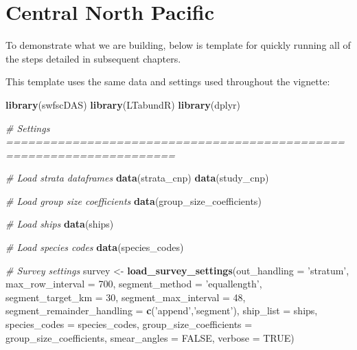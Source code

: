\documentclass[
]{book}
\newenvironment{Shaded}{\begin{snugshade}}{\end{snugshade}}
\newcommand{\CommentTok}[1]{\textcolor[rgb]{0.56,0.35,0.01}{\textit{#1}}}
\newcommand{\DataTypeTok}[1]{\textcolor[rgb]{0.13,0.29,0.53}{#1}}
\newcommand{\DecValTok}[1]{\textcolor[rgb]{0.00,0.00,0.81}{#1}}
\newcommand{\KeywordTok}[1]{\textcolor[rgb]{0.13,0.29,0.53}{\textbf{#1}}}
\newcommand{\NormalTok}[1]{#1}
\newcommand{\OtherTok}[1]{\textcolor[rgb]{0.56,0.35,0.01}{#1}}
\newcommand{\StringTok}[1]{\textcolor[rgb]{0.31,0.60,0.02}{#1}}
\begin{document}
\hypertarget{casestudies}{%
\chapter{Central North Pacific}\label{casestudies}}

To demonstrate what we are building, below is template for quickly running all of the steps detailed in subsequent chapters.

This template uses the same data and settings used throughout the vignette:

\begin{Shaded}
\begin{Highlighting}[]
\KeywordTok{library}\NormalTok{(swfscDAS)}
\KeywordTok{library}\NormalTok{(LTabundR)}
\KeywordTok{library}\NormalTok{(dplyr)}

\CommentTok{# Settings =====================================================================}

\CommentTok{# Load strata dataframes}
\KeywordTok{data}\NormalTok{(strata_cnp)}
\KeywordTok{data}\NormalTok{(study_cnp)}

\CommentTok{# Load group size coefficients}
\KeywordTok{data}\NormalTok{(group_size_coefficients)}

\CommentTok{# Load ships}
\KeywordTok{data}\NormalTok{(ships)}

\CommentTok{# Load species codes}
\KeywordTok{data}\NormalTok{(species_codes)}

\CommentTok{# Survey settings}
\NormalTok{survey <-}\StringTok{ }
\StringTok{  }\KeywordTok{load_survey_settings}\NormalTok{(}\DataTypeTok{out_handling =} \StringTok{'stratum'}\NormalTok{,}
                       \DataTypeTok{max_row_interval =} \DecValTok{700}\NormalTok{,}
                       \DataTypeTok{segment_method =} \StringTok{'equallength'}\NormalTok{,}
                       \DataTypeTok{segment_target_km =} \DecValTok{30}\NormalTok{,}
                       \DataTypeTok{segment_max_interval =} \DecValTok{48}\NormalTok{,}
                       \DataTypeTok{segment_remainder_handling =} \KeywordTok{c}\NormalTok{(}\StringTok{'append'}\NormalTok{,}\StringTok{'segment'}\NormalTok{),}
                       \DataTypeTok{ship_list =}\NormalTok{ ships,}
                       \DataTypeTok{species_codes =}\NormalTok{ species_codes,}
                       \DataTypeTok{group_size_coefficients =}\NormalTok{ group_size_coefficients,}
                       \DataTypeTok{smear_angles =} \OtherTok{FALSE}\NormalTok{,}
                       \DataTypeTok{verbose =} \OtherTok{TRUE}\NormalTok{)}


\end{Highlighting}
\end{Shaded}
\end{document}
